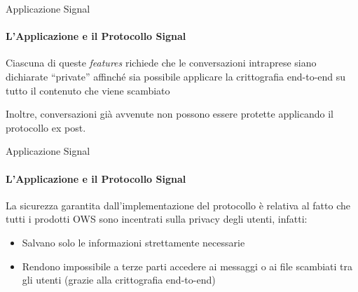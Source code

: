 \begin{frame}{Applicazione Signal}
    \framesubtitle{L'Applicazione e il Protocollo Signal}
    Ciascuna di queste \textit{features} richiede che le conversazioni intraprese siano dichiarate “private” affinché sia possibile applicare la crittografia end-to-end su tutto il contenuto che viene scambiato\newline\pause 

    Inoltre, conversazioni già avvenute non possono essere protette applicando il protocollo ex post.

    \cite{whatsappE2EE}

\end{frame}

\begin{frame}{Applicazione Signal}
    \framesubtitle{L'Applicazione e il Protocollo Signal}
    La sicurezza garantita dall'implementazione del protocollo è relativa al fatto che tutti i prodotti OWS sono incentrati sulla privacy degli utenti, infatti:
    \begin{itemize}
        \item Salvano solo le informazioni strettamente necessarie\pause
        \item Rendono impossibile a terze parti accedere ai messaggi o ai file scambiati tra gli utenti (grazie alla crittografia end-to-end)
    \end{itemize}
    \cite{Lumb}
\end{frame}